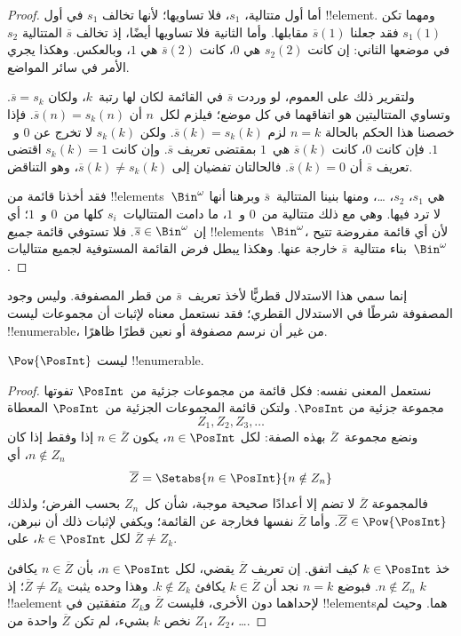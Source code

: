 \documentclass[../../../include/open-logic-section]{subfiles}
\begin{document}
\begin{proof}
أما أول متتالية، $s_1$، فلا تساويها؛ لأنها تخالف $s_1$ في أول !!{element}. ومهما تكن $s_1(1)$ فقد جعلنا $\overline{s}(1)$ مقابلها. وأما الثانية فلا تساويها أيضًا، إذ تخالف $\overline{s}$ المتتالية $s_2$ في موضعها الثاني: إن كانت $s_2(2)$ هي $0$، كانت $\overline{s}(2)$ هي $1$، وبالعكس. وهكذا يجري الأمر في سائر المواضع.

ولتقرير ذلك على العموم، لو وردت $\overline{s}$ في القائمة لكان لها رتبة~$k$، ولكان $\overline{s} = s_{k}$. وتساوي المتتاليتين هو اتفاقهما في كل موضع؛ فيلزم لكل~$n$ أن $\overline{s}(n) =
s_{k}(n)$. فإذا خصصنا هذا الحكم بالحالة $n = k$ لزم $\overline{s}(k) = s_{k}(k)$. ولكن $s_k(k)$ لا تخرج عن $0$ و~$1$. فإن كانت $0$، كانت $\overline{s}(k)$ هي~$1$ بمقتضى تعريف $\overline{s}$. وإن كانت $s_k(k) = 1$ اقتضى تعريف $\overline{s}$ أن $\overline{s}(k) = 0$. فالحالتان تفضيان إلى $\overline{s}(k) \neq s_{k}(k)$، وهو التناقض.

فقد أخذنا قائمة من !!{element}s~$\Bin^\omega$ هي $s_1$، $s_2$، \dots{}، ومنها بنينا المتتالية~$\overline{s}$ وبرهنا أنها لا ترد فيها. وهي مع ذلك متتالية من~$0$ و~$1$، ما دامت المتتاليات~$s_i$ كلها من~$0$ و~$1$؛ أي إن $\overline{s} \in
\Bin^\omega$. فلا تستوفي قائمة \emph{جميع} !!{element}s~$\Bin^\omega$، لأن أي قائمة مفروضة تتيح بناء متتالية~$\overline{s}$ خارجة عنها. وهكذا يبطل فرض القائمة المستوفية لجميع متتاليات~$\Bin^\omega$.
\end{proof}

\begin{explain}
إنما سمي هذا الاستدلال قطريًّا لأخذ تعريف~$\overline{s}$ من قطر المصفوفة. وليس وجود المصفوفة شرطًا في الاستدلال القطري؛ فقد نستعمل معناه لإثبات أن مجموعات ليست !!{enumerable}، من غير أن نرسم مصفوفة أو نعين قطرًا ظاهرًا.
\end{explain}

\begin{thm}
$\Pow{\PosInt}$ ليست !!{enumerable}.
\end{thm}

\begin{proof}
نستعمل المعنى نفسه: فكل قائمة من مجموعات جزئية من~$\PosInt$ تفوتها مجموعة جزئية من $\PosInt$. ولتكن قائمة المجموعات الجزئية من~$\PosInt$ المعطاة
\[
Z_{1}, Z_{2}, Z_{3}, \dots
\]
ونضع مجموعة~$\overline{Z}$ بهذه الصفة: لكل $n \in \PosInt$، يكون $n \in \overline{Z}$ إذا وفقط إذا كان $n \notin Z_{n}$، أي
\[
\overline{Z} = \Setabs{n \in \PosInt}{n \notin Z_n}
\]
فالمجموعة $\overline{Z}$ لا تضم إلا أعدادًا صحيحة موجبة، شأن كل~$Z_n$ بحسب الفرض؛ ولذلك $\overline{Z} \in
\Pow{\PosInt}$. وأما $\overline{Z}$ نفسها فخارجة عن القائمة؛ ويكفي لإثبات ذلك أن نبرهن، لكل $k \in \PosInt$، على $\overline{Z} \neq
Z_k$.

خذ $k \in \PosInt$ كيف اتفق. إن تعريف $\overline{Z}$ يقضي، لكل $n \in \PosInt$، بأن $n \in \overline{Z}$ يكافئ $n \notin Z_n$. فبوضع $n=k$ نجد أن $k \in \overline{Z}$ يكافئ $k \notin Z_k$. وهذا وحده يثبت $\overline{Z} \neq Z_k$؛ إذ $k$ !!a{element} لإحداهما دون الأخرى، فليست $\overline{Z}$ و$Z_k$ متفقتين في !!{element}sهما. وحيث لم نخص $k$ بشيء، لم تكن $\overline{Z}$ واحدة من $Z_1$، $Z_2$، \dots.
\end{proof}
\end{document}
